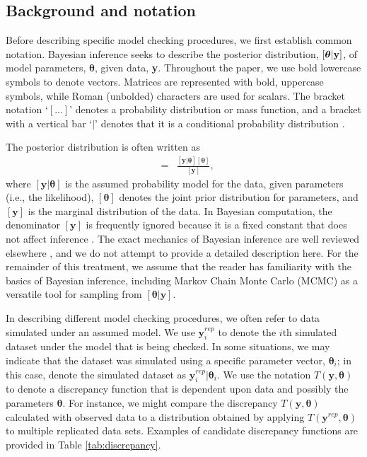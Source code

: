 \documentclass[12pt,english]{article}
\begin{document}
\begin{spacing}{1.9}
\section{Background and notation}

Before describing specific model checking procedures, we first
establish common notation.  Bayesian inference seeks to describe the
posterior distribution, $[\boldsymbol{\theta} | {\bf y}]$, of model
parameters, $\boldsymbol{\theta}$, given data, \textbf{y}.  Throughout
the paper, we use bold lowercase symbols to denote vectors.  Matrices
are represented with bold, uppercase symbols, while Roman (unbolded)
characters are used for scalars.  The bracket notation `$[ \hdots ]$'
denotes a probability distribution or mass function, and a bracket
with a vertical bar `$|$' denotes that it is a conditional probability
distribution \citep{GelfandSmith1990}.

The posterior distribution is often written as
\begin{eqnarray}
  [\boldsymbol{\theta} | \textbf{y}] & = & \frac{[\textbf{y} | \boldsymbol{\theta}] [\boldsymbol{\theta}]}{[\textbf{y}]},
\end{eqnarray}
where $[\textbf{y}|\boldsymbol{\theta}]$ is the assumed probability
model for the data, given parameters (i.e., the likelihood),
$[\boldsymbol{\theta}]$ denotes the joint prior distribution for
parameters, and $[\textbf{y}]$ is the marginal distribution of the
data.  In Bayesian computation, the denominator $[\textbf{y}]$ is
frequently ignored because it is a fixed constant that does not affect
inference \citep[although it is needed when computing Bayes factors
for model comparison and averaging;][]{LinkBarker2006}.  The exact
mechanics of Bayesian inference are well reviewed elsewhere
\citep[e.g.,][]{KingEtAl2009,LinkBarker2010,HobbsHooten2015}, and we
do not attempt to provide a detailed description here.  For the
remainder of this treatment, we assume that the reader has familiarity
with the basics of Bayesian inference, including Markov Chain Monte
Carlo (MCMC) as a versatile tool for sampling from
$[\boldsymbol{\theta}|\textbf{y}]$.

In describing different model checking procedures, we often refer to
data simulated under an assumed model.  We use $\textbf{y}_i^{rep}$ to
denote the $i$th simulated dataset under the model that is being
checked.  In some situations, we may indicate that the dataset was
simulated using a specific parameter vector, $\boldsymbol{\theta}_i$;
in this case, denote the simulated dataset as
$\textbf{y}_i^{rep}|\boldsymbol{\theta}_i$.  We use the notation
$T(\textbf{y},\boldsymbol{\theta})$ to denote a discrepancy function
that is dependent upon data and possibly the parameters
$\boldsymbol{\theta}$.  For instance, we might compare the discrepancy
$T(\textbf{y},\boldsymbol{\theta})$ calculated with observed data to a
distribution obtained by applying
$T(\textbf{y}^{rep},\boldsymbol{\theta})$ to multiple replicated data
sets.  Examples of candidate discrepancy functions are provided in
Table \ref{tab:discrepancy}.


\end{spacing}
\end{document}
